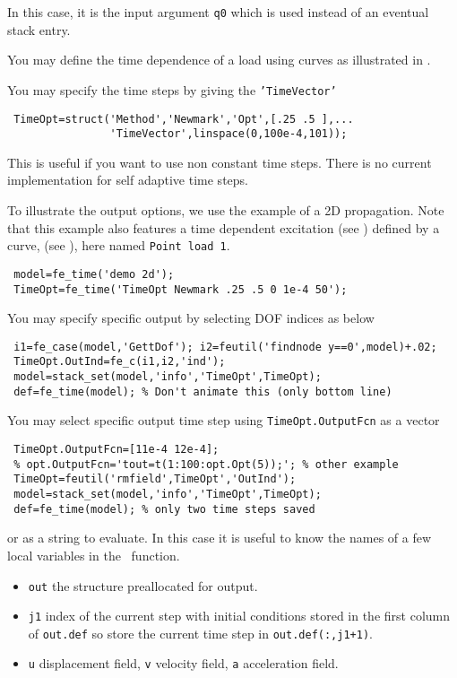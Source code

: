 In this case, it is the input argument {\tt q0} which is used instead of an eventual stack entry.


You may define the time dependence of a load using curves as illustrated in .

You may specify the time steps by giving the {\tt 'TimeVector'} 
\begin{verbatim}
 TimeOpt=struct('Method','Newmark','Opt',[.25 .5 ],...
                'TimeVector',linspace(0,100e-4,101));
\end{verbatim}


This is useful if you want to use non constant time steps. There is no current implementation for self adaptive time steps.

To illustrate the output options, we use the example of a 2D propagation. Note that this example also features a time dependent  excitation (see \fecase) defined by a curve, (see \fecurve), here named {\tt Point load 1}.

\begin{verbatim}
 model=fe_time('demo 2d'); 
 TimeOpt=fe_time('TimeOpt Newmark .25 .5 0 1e-4 50');
\end{verbatim}%


You may specify specific output by selecting DOF indices as below 

\begin{verbatim}
 i1=fe_case(model,'GettDof'); i2=feutil('findnode y==0',model)+.02;
 TimeOpt.OutInd=fe_c(i1,i2,'ind');
 model=stack_set(model,'info','TimeOpt',TimeOpt);
 def=fe_time(model); % Don't animate this (only bottom line)
\end{verbatim}%


You may select specific output time step using {\tt TimeOpt.OutputFcn} as a vector

\begin{verbatim}
 TimeOpt.OutputFcn=[11e-4 12e-4];
 % opt.OutputFcn='tout=t(1:100:opt.Opt(5));'; % other example
 TimeOpt=feutil('rmfield',TimeOpt','OutInd');
 model=stack_set(model,'info','TimeOpt',TimeOpt);
 def=fe_time(model); % only two time steps saved
\end{verbatim}%


or as a string to evaluate. In this case it is useful to know the names of a few local variables in the \fetime\ function. 
\begin{itemize}
\item {\tt out} the structure preallocated for output.
\item {\tt j1} index of the current step with initial conditions stored in the first column of {\tt out.def} so store the current time step in {\tt out.def(:,j1+1)}.
\item {\tt u} displacement field, {\tt v} velocity field,  {\tt a} acceleration field.  
\end{itemize}

